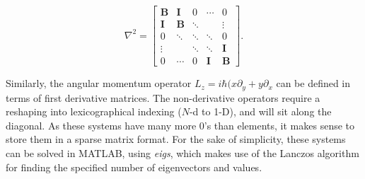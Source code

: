 \begin{equation}
    \nabla^2=
    \begin{bmatrix}
        \mathbf{B}    & \mathbf{I} &      0      &  \cdots      &      0       \\
        \mathbf{I}    & \mathbf{B} &  \ddots     &              &  \vdots      \\
        0             & \ddots     &  \ddots     &  \ddots      &      0       \\
        \vdots        &            &  \ddots     &  \ddots      &  \mathbf{I}  \\
        0             & \cdots     &      0      &  \mathbf{I}  &  \mathbf{B}
    \end{bmatrix}.
\end{equation}

Similarly, the angular momentum operator $L_z = i\hbar(x\partial_y + y\partial_x$ can be defined in terms of first derivative matrices. The non-derivative operators require a reshaping into lexicographical indexing ($N$-d to 1-D), and will sit along the diagonal. As these systems have many more 0's than elements, it makes sense to store them in a sparse matrix format. For the sake of simplicity, these systems can be solved in MATLAB, using \textit{eigs}, which makes use of the Lanczos algorithm for finding the specified number of eigenvectors and values.
